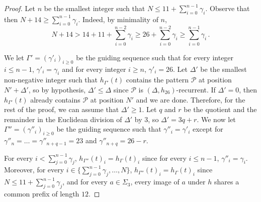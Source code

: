\documentclass[12pt]{article}
\theoremstyle{definition}
\begin{document}
\begin{proof}
    Let $n$ be the smallest integer such that $N \le 11 + \sum_{i = 0}^{n - 1} \gamma_i$. Observe that then $N + 14 \ge \sum_{i = 0}^{n - 1} \gamma_i$.
    Indeed, by minimality of $n$, 
    \begin{equation*}
        N+14 > 14+11 + \sum_{i = 0}^{n - 2} \gamma_i    \ge 26 + \sum_{i = 0}^{n - 2} \gamma_i            
        \ge \sum_{i = 0}^{n - 1} \gamma_i\,.
    \end{equation*}
    
    We let $\Gamma' = (\gamma'_i)_{i \ge 0}$ be the guiding sequence such that for every integer $i \le n - 1$, $\gamma'_i = \gamma_i$ and for every integer $i \ge n$, $\gamma'_i = 26$. 
    Let $\Delta'$ be the smallest non-negative integer such that $h_{\Gamma'}(t)$ contains the pattern $\mathcal{P}$ at position $N' + \Delta'$, so by hypothesis, $\Delta' \le \Delta$ since $\mathcal{P}$ is $(\Delta, h_{26})$-recurrent. If $\Delta' = 0$, then $h_{\Gamma'}(t)$ already contains $\mathcal{P}$ at position $N'$ and we are done. Therefore, for the rest of the proof, we can assume that $\Delta' \ge 1$. Let $q$ and $r$ be the quotient and the remainder in the Euclidean division of $\Delta'$ by $3$, so $\Delta' = 3q + r$. We now let $\Gamma''= (\gamma''_i)_{i \ge 0}$ be the guiding sequence such that $\gamma''_i = \gamma'_i$ except for $\gamma''_n = \dots = \gamma''_{n + q - 1} = 23$ and $\gamma''_{n + q} = 26 - r$. 
    
    For every $i < \sum_{j = 0}^{n - 1}\gamma_j$, $h_{\Gamma''}(t)_i = h_\Gamma(t)_i$ since for every $i \le n - 1$, $\gamma''_i = \gamma_i$. Moreover, for every $i\in\{\sum_{j = 0}^{n - 1}\gamma_j, \dots, N\}$, $h_{\Gamma''}(t)_i = h_\Gamma(t)_i$ since $N \le 11 + \sum_{j = 0}^{n - 1}\gamma_j$, and for every $a \in \Sigma_3$, every image of $a$ under $h$ shares a common prefix of length $12$. 
    

\end{proof}
\end{document}
